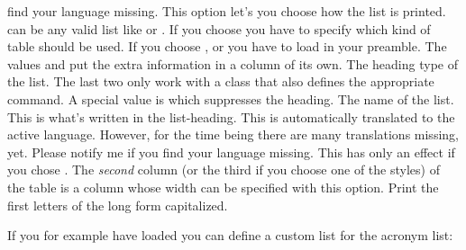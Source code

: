 \documentclass[load-preamble+,scrartcl={DIV10}]{cnltx-doc}
\begin{document}
\begin{options}
    find your language missing.
    This option let's you choose how the list is printed.   can be
    any valid list like  or .
    If you choose  you have to specify which kind of
    table should be used.  If you choose ,
     or  you have to load
     in your preamble.  The values  and
     put the extra information in a column of its
    own.
  \null
    The heading type of the list. The last two only work
    with a \KOMAScript{} class that also defines the appropriate command.  A
    special value is  which suppresses the heading.
    The name of the list.  This is what's written in the list-heading.  This
    is automatically translated to the active language.  However, for the time
    being there are many translations missing, yet.  Please notify me if you
    find your language missing.
    This has only an effect if you chose .  The
    \emph{second} column (or the third if you choose one of the 
    styles) of the table is a  column whose width can be specified
    with this option.
    Print the first letters of the long form capitalized.
 \end{options}
  
If you for example have loaded  you can define a custom list for
the acronym list:
\begin{sourcecode}
  \newcommand*\addcolon[1]{#1:}
  \printacronyms
\end{sourcecode}
\newcommand*\addcolon[1]{#1:}
\printacronyms
\end{document}
